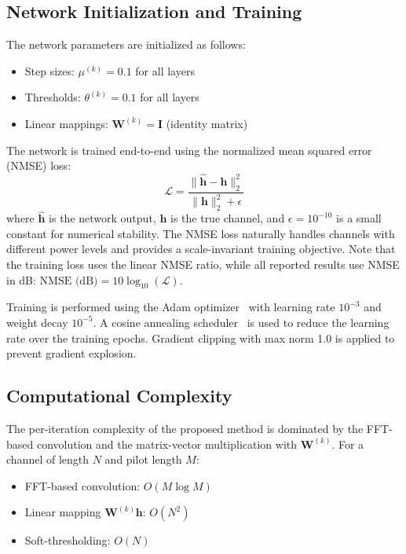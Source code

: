 \documentclass[a4paper,fleqn]{cas-sc}
\begin{document}
\subsection{Network Initialization and Training}

The network parameters are initialized as follows:
\begin{itemize}
\item Step sizes: $\mu^{(k)} = 0.1$ for all layers
\item Thresholds: $\theta^{(k)} = 0.1$ for all layers
\item Linear mappings: $\mathbf{W}^{(k)} = \mathbf{I}$ (identity matrix)
\end{itemize}

The network is trained end-to-end using the normalized mean squared error (NMSE) loss:
\begin{equation}\label{eq:loss}
\mathcal{L} = \frac{\|\hat{\mathbf{h}} - \mathbf{h}\|_2^2}{\|\mathbf{h}\|_2^2 + \epsilon}
\end{equation}
where $\hat{\mathbf{h}}$ is the network output, $\mathbf{h}$ is the true channel, and $\epsilon = 10^{-10}$ is a small constant for numerical stability. The NMSE loss naturally handles channels with different power levels and provides a scale-invariant training objective. Note that the training loss uses the linear NMSE ratio, while all reported results use NMSE in dB: $\text{NMSE (dB)} = 10 \log_{10}(\mathcal{L})$.

Training is performed using the Adam optimizer~\citep{kingma2015adam} with learning rate $10^{-3}$ and weight decay $10^{-5}$. A cosine annealing scheduler~\citep{loshchilov2017sgdr} is used to reduce the learning rate over the training epochs. Gradient clipping with max norm 1.0 is applied to prevent gradient explosion.

\subsection{Computational Complexity}

The per-iteration complexity of the proposed method is dominated by the FFT-based convolution and the matrix-vector multiplication with $\mathbf{W}^{(k)}$. For a channel of length $N$ and pilot length $M$:
\begin{itemize}
\item FFT-based convolution: $O(M \log M)$
\item Linear mapping $\mathbf{W}^{(k)} \mathbf{h}$: $O(N^2)$
\item Soft-thresholding: $O(N)$
\end{itemize}
\end{document}
